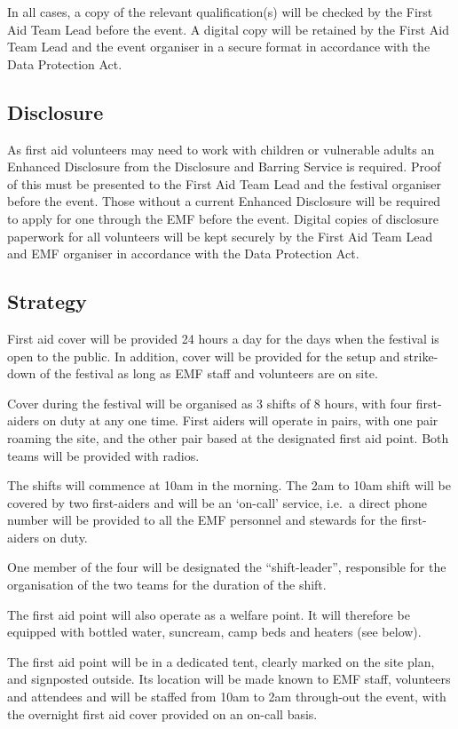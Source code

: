 In all cases, a copy of the relevant qualification(s) will be checked by the
First Aid Team Lead before the event. A digital copy will be retained by the
First Aid Team Lead and the event organiser in a secure format in accordance
with the Data Protection Act.

\subsection{Disclosure}
As first aid volunteers may need to work with children or vulnerable adults an
Enhanced Disclosure from the Disclosure and Barring Service is required. Proof
of this must be presented to the First Aid Team Lead and the festival organiser
before the event. Those without a current Enhanced Disclosure will be required
to apply for one through the EMF before the event. Digital copies of disclosure
paperwork for all volunteers will be kept securely by the First Aid Team Lead and
EMF organiser in accordance with the Data Protection Act.

\subsection{Strategy}
First aid cover will be provided 24 hours a day for the days when the festival
is open to the public. In addition, cover will be provided for the setup and
strike-down of the festival as long as EMF staff and volunteers are on site.

Cover during the festival will be organised as 3 shifts of 8 hours, with four 
first-aiders on duty at any one time. First aiders will operate in pairs, with 
one pair roaming the site, and the other pair based at the designated first aid 
point. Both teams will be provided with radios.

The shifts will commence at 10am in the morning. The 2am to 10am shift will
be covered by two first-aiders and will be an `on-call’ service, i.e.\ a direct
phone number will be provided to all the EMF personnel and stewards for the
first-aiders on duty.

One member of the four will be designated the ``shift-leader'', responsible for
the organisation of the two teams for the duration of the shift.

The first aid point will also operate as a welfare point. It will therefore be
equipped with bottled water, suncream, camp beds and heaters (see below).

The first aid point will be in a dedicated tent, clearly marked on the site
plan, and signposted outside. Its location will be made known to EMF staff,
volunteers and attendees and will be staffed from 10am to 2am through-out
the event, with the overnight first aid cover provided on an on-call basis.

